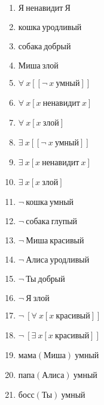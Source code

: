 \documentclass{article}
\begin{document}
\begin{enumerate}
\item $\text{Я} \ \text{ненавидит} \ \text{Я}$

\item $\text{кошка} \ \text{уродливый}$

\item $\text{собака} \ \text{добрый}$

\item $\text{Миша} \ \text{злой}$

\item $\forall \ x[[\neg \ x \ \text{умный}]]$

\item $\forall \ x[x \ \text{ненавидит} \ x]$

\item $\forall \ x[x \ \text{злой}]$

\item $\exists \ x[[\neg \ x \ \text{умный}]]$

\item $\exists \ x[x \ \text{ненавидит} \ x]$

\item $\exists \ x[x \ \text{злой}]$

\item $\neg \ \text{кошка} \ \text{умный}$

\item $\neg \ \text{собака} \ \text{глупый}$

\item $\neg \ \text{Миша} \ \text{красивый}$

\item $\neg \ \text{Алиса} \ \text{уродливый}$

\item $\neg \ \text{Ты} \ \text{добрый}$

\item $\neg \ \text{Я} \ \text{злой}$

\item $\neg \ [\forall \ x[x \ \text{красивый}]]$

\item $\neg \ [\exists \ x[x \ \text{красивый}]]$

\item $\text{мама}(\text{Миша}) \ \text{умный}$

\item $\text{папа}(\text{Алиса}) \ \text{умный}$

\item $\text{босс}(\text{Ты}) \ \text{умный}$


\end{enumerate}
\end{document}
